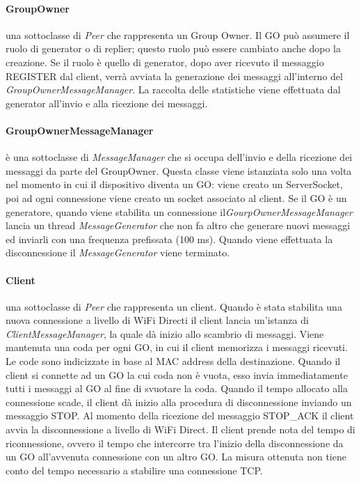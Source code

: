 \documentclass{llncs}
\begin{document}
\paragraph{GroupOwner} una sottoclasse di \emph{Peer} che rappresenta un Group Owner. Il GO può assumere il ruolo di generator o di replier; questo ruolo può essere cambiato anche dopo la creazione. Se il ruolo è quello di generator, 
dopo aver ricevuto il messaggio REGISTER dal client, verrà avviata la generazione dei messaggi all'interno del \emph{GroupOwnerMessageManager}. La raccolta delle statistiche viene effettuata dal generator all'invio e alla ricezione dei messaggi.

\paragraph{GroupOwnerMessageManager} è una sottoclasse di \emph{MessageManager} che si occupa dell'invio e della ricezione dei messaggi da parte del GroupOwner. Questa classe viene istanziata solo una volta nel momento in cui 
il dispositivo diventa un GO: viene creato un ServerSocket, poi ad ogni connessione viene creato un socket associato al client. Se il GO è un generatore, quando viene stabilita un connessione il\emph{GourpOwnerMessageManager} lancia 
un thread \emph{MessageGenerator} che non fa altro che generare nuovi messaggi ed inviarli con una frequenza prefissata (100 ms). Quando viene effettuata la disconnessione il \emph{MessageGenerator} viene terminato.

\paragraph{Client} una sottoclasse di \emph{Peer} che rappresenta un client. Quando è stata stabilita una nuova connessione a livello di WiFi Directi il client lancia un'istanza di \emph{ClientMessageManager}, la quale dà inizio allo 
scambrio di messaggi. Viene mantenuta una coda per ogni GO, 
in cui il client memorizza i messaggi ricevuti. Le code sono indicizzate in base al MAC address della destinazione. Quando il client si connette ad un GO la cui coda non è vuota, esso invia immediatamente tutti i messaggi al GO al 
fine di svuotare la coda. Quando il tempo allocato alla connessione scade, il client dà inizio alla procedura di disconnessione inviando un messaggio STOP. Al momento della ricezione del messaggio STOP\_ACK il client avvia 
la disconnessione a livello di WiFi Direct. Il client prende nota del tempo di riconnessione, ovvero il tempo che intercorre tra l'inizio della disconnessione da un GO all'avvenuta connessione con un altro GO. La misura ottenuta non 
tiene conto del tempo necessario a stabilire una connessione TCP.
\end{document}
